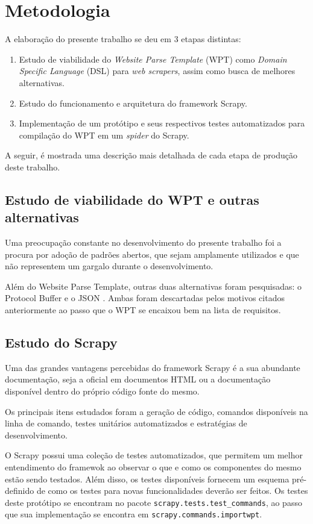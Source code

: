 \chapter{Metodologia}

A elaboração do presente trabalho se deu em 3 etapas distintas:

\begin{enumerate}
	\item Estudo de viabilidade do \emph{Website Parse Template} (WPT) como \emph{Domain Specific Language} (DSL) para \emph{web scrapers}, assim como busca de melhores alternativas.
	\item Estudo do funcionamento e arquitetura do framework Scrapy.
	\item Implementação de um protótipo e seus respectivos testes automatizados para compilação do WPT em um \emph{spider} do Scrapy.
\end{enumerate}

A seguir, é mostrada uma descrição mais detalhada de cada etapa de produção deste trabalho.

\section{Estudo de viabilidade do WPT e outras alternativas}

Uma preocupação constante no desenvolvimento do presente trabalho foi a procura por adoção de padrões abertos, que sejam amplamente utilizados e que não representem um gargalo durante o desenvolvimento.

Além do Website Parse Template, outras duas alternativas foram pesquisadas: o Protocol Buffer \cite{protobuf} e o JSON \cite{JSON}. Ambas foram descartadas pelos motivos citados anteriormente ao passo que o WPT se encaixou bem na lista de requisitos.

\section{Estudo do Scrapy}

Uma das grandes vantagens percebidas do framework Scrapy é a sua abundante documentação, seja a oficial em documentos HTML ou a documentação disponível dentro do próprio código fonte do mesmo.

Os principais itens estudados foram a geração de código, comandos disponíveis na linha de comando, testes unitários automatizados e estratégias de desenvolvimento.

O Scrapy possui uma coleção de testes automatizados, que permitem um melhor entendimento do framewok ao observar o que e como os componentes do mesmo estão sendo testados. Além disso, os testes disponíveis fornecem um esquema pré-definido de como os testes para novas funcionalidades deverão ser feitos. Os testes deste protótipo se encontram no pacote \texttt{scrapy.tests.test\_commands}, ao passo que sua implementação se encontra em \texttt{scrapy.commands.importwpt}.

